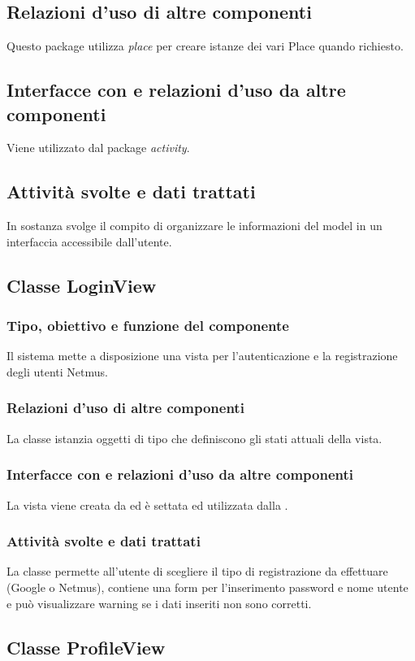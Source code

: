 \subsection*{Relazioni d'uso di altre componenti}
Questo package utilizza \emph{place} per creare istanze dei vari Place quando
richiesto.
\subsection*{Interfacce con e relazioni d'uso da altre componenti}
Viene utilizzato dal package \emph{activity}.
\subsection*{Attivit\`a svolte e dati trattati}
In sostanza svolge il compito di organizzare le informazioni del model in un
interfaccia accessibile dall'utente.

\subsection{Classe LoginView}
\subsubsection*{Tipo, obiettivo e funzione del componente}
Il sistema mette a disposizione una vista per l'autenticazione e la
registrazione degli utenti Netmus.
\subsubsection*{Relazioni d'uso di altre componenti}
La classe istanzia oggetti di tipo  che definiscono gli stati
attuali della vista.
\subsubsection*{Interfacce con e relazioni d'uso da altre componenti}
La vista viene creata da  ed \`e settata ed utilizzata dalla
.
\subsubsection*{Attivit\`a svolte e dati trattati}
La classe permette all'utente di scegliere il tipo di registrazione da
effettuare (Google o Netmus), contiene una form per l'inserimento password e
nome utente e pu\`o visualizzare warning se i dati inseriti non sono corretti.

\subsection{Classe ProfileView}
